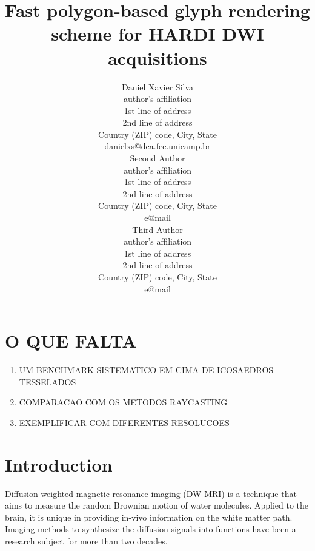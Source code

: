\documentclass[twoside,twocolumn,10pt]{article}
\title{Fast polygon-based glyph rendering scheme for HARDI DWI acquisitions}
\author{
\parbox{0.25\textwidth}{\centering
Daniel Xavier Silva\\[1mm]
author's affiliation\\
1st line of address\\
2nd line of address\\
Country (ZIP) code, City, State\\[1mm]
danielxs@dca.fee.unicamp.br
}
\hspace{0.05\textwidth}
\parbox{0.25\textwidth}{\centering
Second Author\\[1mm]
author's affiliation\\
1st line of address\\
2nd line of address\\
Country (ZIP) code, City, State\\[1mm]
e@mail
}
\hspace{0.05\textwidth}
\parbox{0.25\textwidth}{\centering
Third Author\\[1mm]
author's affiliation\\
1st line of address\\
2nd line of address\\
Country (ZIP) code, City, State\\[1mm]
e@mail
}
}
\begin{document}



\section{O QUE FALTA}
\begin{enumerate}
    \item UM BENCHMARK SISTEMATICO EM CIMA DE ICOSAEDROS TESSELADOS
    \item COMPARACAO COM OS METODOS RAYCASTING
    \item EXEMPLIFICAR COM DIFERENTES RESOLUCOES
    
\end{enumerate}


\section{Introduction}

\copyrightspace

Diffusion-weighted magnetic resonance imaging (DW-MRI) is a technique that aims to measure the random Brownian motion of water molecules. Applied to the brain, it is unique in providing in-vivo information on the white matter path. Imaging methods to synthesize the diffusion signals into functions have been a research subject for more than two decades.
\end{document}
